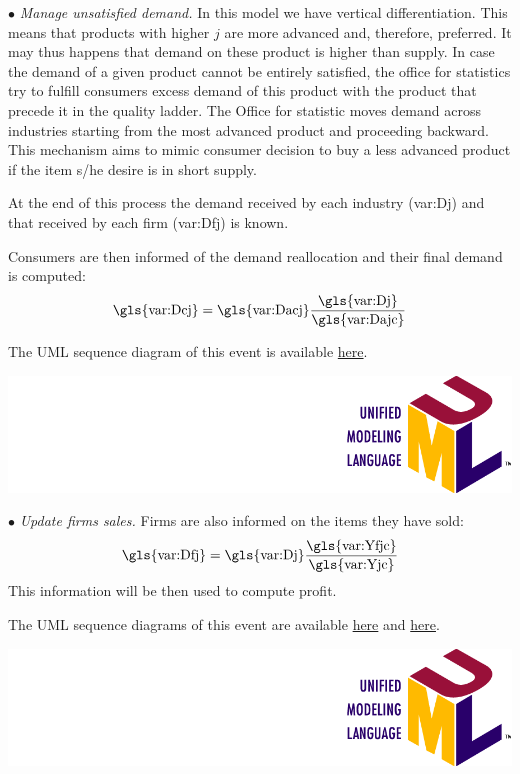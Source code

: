 \documentclass{book}
\newcommand{\doclocation}{file:///Users/giulioni/Documents/workspace/gabriele/docs}
\begin{document}
\noindent$\bullet$ \textit{Manage unsatisfied demand.} In this model we have vertical differentiation. This means that products with higher $j$ are more advanced and, therefore, preferred. It may thus happens that demand on these product is higher than supply. 
In case the demand of a given product cannot be entirely satisfied, the office for statistics try to fulfill consumers excess demand of this product with the product that precede it in the quality ladder. The Office for statistic moves demand across industries starting from the most advanced product and proceeding backward. 
This mechanism aims to mimic consumer decision to buy a less advanced product if the item s/he desire is in short supply.

At the end of this process the demand received by each industry (\gls{var:Dj}) and that received by each firm (\gls{var:Dfj}) is known.

Consumers are then informed of the demand reallocation and their final demand is computed:
\[
	\textnormal{\gls{var:Dcj}}= \textnormal{\gls{var:Dacj}}\frac{\textnormal{\gls{var:Dj}}}{\textnormal{\gls{var:Dajc}}}
\]


The UML sequence diagram of this event is available \href{\doclocation/umldoc/matchDemandAndSupply.html}{here}.
\begin{marginfigure}
	\includegraphics[scale=0.1]{uml.png}
\end{marginfigure}


\noindent$\bullet$ \textit{Update firms sales.}
Firms are also informed on the items they have sold:
\[
	\textnormal{\gls{var:Dfj}}=\textnormal{\gls{var:Dj}}  \frac{\textnormal{\gls{var:Yfjc}}}{\textnormal{\gls{var:Yjc}}}
\]
This information will be then used to compute profit.

The UML sequence diagrams of this event are available \href{\doclocation/umldoc/computeDemand.html}{here} and \href{\doclocation/umldoc/allocateDemand.html}{here}.
\begin{marginfigure}
	\includegraphics[scale=0.1]{uml.png}
\end{marginfigure}
\end{document}
